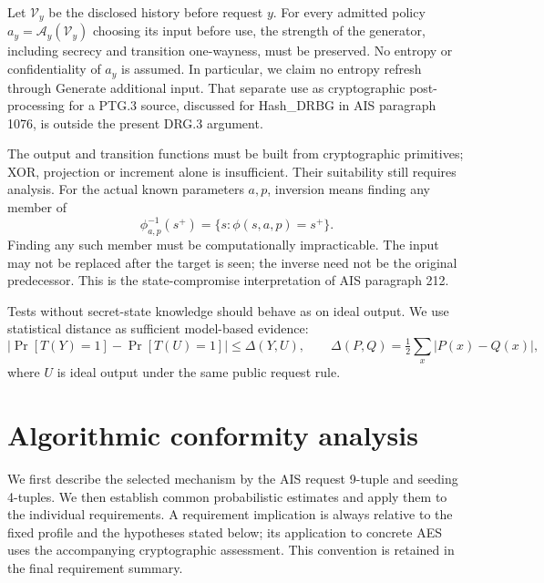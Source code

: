 \documentclass[journal=tosc,preprint,floatrow,nohyperxmp]{iacrtrans}
\newif\ifjordireview
\newcounter{jordinote}
\newcommand{\jordinote}[2]{%
  \ifjordireview
  \stepcounter{jordinote}\par\medskip\noindent
  \fcolorbox{blue!55!black}{blue!4}{%
    \begin{minipage}{\dimexpr\linewidth-2\fboxsep-2\fboxrule\relax}
    \small\raggedright\color{blue!45!black}
    \textbf{Solo Jordi -- J\thejordinote: #1}\par\smallskip
    #2
    \end{minipage}}\par\medskip
  \fi
}
\numberwithin{lemma}{section}
\numberwithin{proposition}{section}
\numberwithin{equation}{section}
\theoremstyle{definition}
\numberwithin{definition}{section}
\theoremstyle{plain}
\begin{document}
\begin{definition}\label{def:additional}
Let $\mathcal V_y$ be the disclosed history before request $y$. For every admitted policy $a_y=\mathcal A_y(\mathcal V_y)$ choosing its input before use, the strength of the generator, including secrecy and transition one-wayness, must be preserved. No entropy or confidentiality of $a_y$ is assumed. In particular, we claim no entropy refresh through Generate additional input. That separate use as cryptographic post-processing for a PTG.3 source, discussed for Hash\_DRBG in AIS paragraph 1076, is outside the present DRG.3 argument.
\end{definition}
\begin{definition}\label{def:oneway}
The output and transition functions must be built from cryptographic primitives; XOR, projection or increment alone is insufficient. Their suitability still requires analysis. For the actual known parameters $a,p$, inversion means finding any member of
\[
 \phi_{a,p}^{-1}(s^+)=\{s:\phi(s,a,p)=s^+\}.
\]
Finding any such member must be computationally impracticable. The input may not be replaced after the target is seen; the inverse need not be the original predecessor. This is the state-compromise interpretation of AIS paragraph 212.
\end{definition}
\begin{definition}\label{def:statistics}
Tests without secret-state knowledge should behave as on ideal output. We use statistical distance as sufficient model-based evidence:
\[
 |\Pr[T(Y)=1]-\Pr[T(U)=1]|\le\Delta(Y,U),\qquad
 \Delta(P,Q)=\tfrac12\sum_x|P(x)-Q(x)|,
\]
where $U$ is ideal output under the same public request rule.
\end{definition}

\jordinote{Qué sabe el observador}{Antes de entrar en las tuplas, contrasta estas definiciones con AIS 207--215. La orientación temporal y el instante de compromiso importan: forward secrecy ordinaria no promete ocultar el futuro a quien conoce el estado actual. Comprueba también que estamos protegiendo números internos, y no solamente peticiones completas, salvo la granularidad expresamente elegida para .7.}

\section{Algorithmic conformity analysis}\label{sec:conformity}\label{sec:tuples}
We first describe the selected mechanism by the AIS request 9-tuple and seeding 4-tuples. We then establish common probabilistic estimates and apply them to the individual requirements. A requirement implication is always relative to the fixed profile and the hypotheses stated below; its application to concrete AES uses the accompanying cryptographic assessment. This convention is retained in the final requirement summary.
\end{document}
